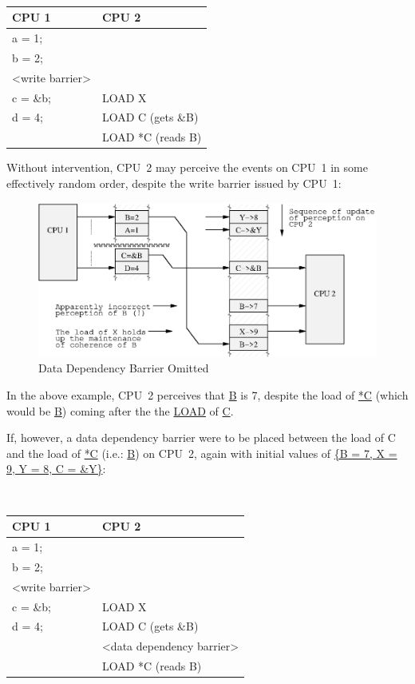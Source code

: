 \vspace{5pt}
\begin{minipage}[t]{\columnwidth}
\tt
\begin{tabular}{l|p{1.5in}}
	CPU 1 &		CPU 2 \\
	\hline
	a = 1; & \\
	b = 2; & \\
	<write barrier> & \\
	c = \&b; & 	LOAD X\\
	d = 4;	&	LOAD C (gets \&B) \\
		&	LOAD *C (reads B) \\
\end{tabular}
\end{minipage}
\vspace{5pt}

Without intervention, CPU~2 may perceive the events on CPU~1 in some
effectively random order, despite the write barrier issued by CPU~1:

\begin{figure}[htb]
\begin{center}
\includegraphics{advsync/DataDependencyNeeded}
\end{center}
\caption{Data Dependency Barrier Omitted}
\end{figure}

In the above example, CPU~2 perceives that \url{B} is 7,
despite the load of \url{*C}
(which would be \url{B}) coming after the the \url{LOAD} of \url{C}.

If, however, a data dependency barrier were to be placed between the load of C
and the load of \url{*C} (i.e.: \url{B}) on CPU~2, again with initial values of
\url{{B = 7, X = 9, Y = 8, C = &Y}}:

\vspace{5pt}
\begin{minipage}[t]{\columnwidth}
\tt
\begin{tabular}{l|p{1.5in}}
	CPU 1 &		CPU 2 \\
	\hline
	a = 1; & \\
	b = 2; & \\
	<write barrier> & \\
	c = \&b; & 	LOAD X\\
	d = 4;	&	LOAD C (gets \&B) \\
		&	<data dependency barrier> \\
		&	LOAD *C (reads B) \\
\end{tabular}
\end{minipage}
\vspace{5pt}

